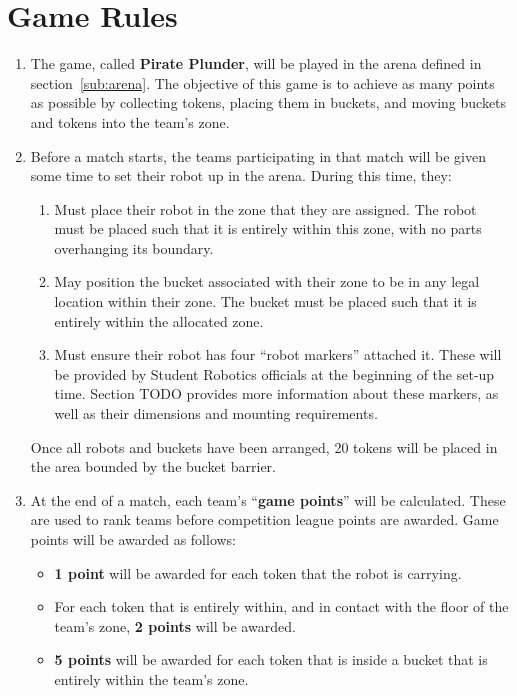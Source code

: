 \section {Game Rules}
\label{game-rules}

\begin{enumerate}
\item The game, called \textbf{Pirate Plunder}, will be played in the arena defined in section~\ref{sub:arena}.  The objective of this game is to achieve as many points as possible by collecting tokens, placing them in buckets, and moving buckets and tokens into the team's zone.

\item Before a match starts, the teams participating in that match will be given some time to set their robot up in the arena.  During this time, they:
\begin{enumerate}
  \item Must place their robot in the zone that they are assigned.  The robot must be placed such that it is entirely within this zone, with no parts overhanging its boundary.

  \item May position the bucket associated with their zone to be in any legal location within their zone.  The bucket must be placed such that it is entirely within the allocated zone.

  \item Must ensure their robot has four ``robot markers'' attached it.  These will be provided by Student Robotics officials at the beginning of the set-up time.  Section TODO provides more information about these markers, as well as their dimensions and mounting requirements.
\end{enumerate}
Once all robots and buckets have been arranged, 20 tokens will be placed in the area bounded by the bucket barrier.

\item At the end of a match, each team's ``\textbf{game points}'' will be calculated.
 These are used to rank teams before competition league points are awarded.  Game points will be awarded as follows:
\begin{itemize}
  \item \textbf{1 point} will be awarded for each token that the robot is carrying.
  \item For each token that is entirely within, and in contact with the floor of the team's zone, \textbf{2 points} will be awarded.
  \item \textbf{5 points} will be awarded for each token that is inside a bucket that is entirely within the team's zone.


\end{itemize}
\end{enumerate}
